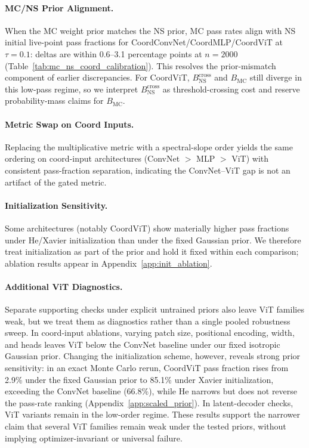 \documentclass{article}
\begin{document}
\paragraph{MC/NS Prior Alignment.} When the MC weight prior matches the NS prior, MC pass rates align with NS initial live-point pass fractions for CoordConvNet/CoordMLP/CoordViT at $\tau=0.1$: deltas are within 0.6--3.1 percentage points at $n=2000$ (Table~\ref{tab:mc_ns_coord_calibration}). This resolves the prior-mismatch component of earlier discrepancies. For CoordViT, $B_{\text{NS}}^{\text{cross}}$ and $B_{\text{MC}}$ still diverge in this low-pass regime, so we interpret $B_{\text{NS}}^{\text{cross}}$ as threshold-crossing cost and reserve probability-mass claims for $B_{\text{MC}}$.

\paragraph{Metric Swap on Coord Inputs.} Replacing the multiplicative metric with a spectral-slope order \cite{field1987relations} yields the same ordering on coord-input architectures (ConvNet $>$ MLP $>$ ViT) with consistent pass-fraction separation, indicating the ConvNet--ViT gap is not an artifact of the gated metric.

\paragraph{Initialization Sensitivity.} Some architectures (notably CoordViT) show materially higher pass fractions under He/Xavier initialization than under the fixed Gaussian prior. We therefore treat initialization as part of the prior and hold it fixed within each comparison; ablation results appear in Appendix~\ref{app:init_ablation}.

\paragraph{Additional ViT Diagnostics.} Separate supporting checks under explicit untrained priors also leave ViT families weak, but we treat them as diagnostics rather than a single pooled robustness sweep. In coord-input ablations, varying patch size, positional encoding, width, and heads leaves ViT below the ConvNet baseline under our fixed isotropic Gaussian prior. Changing the initialization scheme, however, reveals strong prior sensitivity: in an exact Monte Carlo rerun, CoordViT pass fraction rises from 2.9\% under the fixed Gaussian prior to 85.1\% under Xavier initialization, exceeding the ConvNet baseline (66.8\%), while He narrows but does not reverse the pass-rate ranking (Appendix~\ref{app:scaled_prior}). In latent-decoder checks, ViT variants remain in the low-order regime. These results support the narrower claim that several ViT families remain weak under the tested priors, without implying optimizer-invariant or universal failure.
\end{document}
